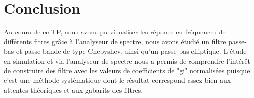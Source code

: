 \section{Conclusion}  

Au cours de ce TP, nous avons pu visualiser les réponse en fréquences de différents fitres grâce à l'analyseur de spectre, nous avons étudié un filtre passe-bas et passe-bande de type Chebyshev, ainsi qu'un passe-bas elliptique. L'étude en simulation et via l'analyseur de spectre nous a permis de comprendre l'intérêt de construire des filtre avec les valeurs de coefficients de "gi" normalisées puisque c'est une méthode systématique dont le résultat correspond assez bien aux attentes théoriques et aux gabarits des filtres.  